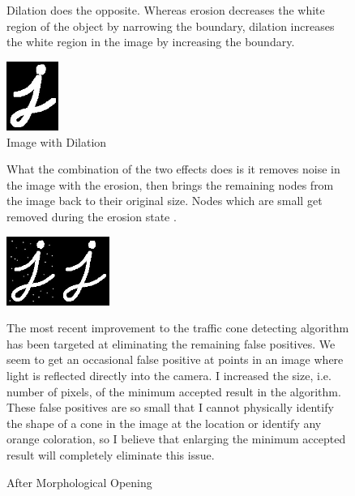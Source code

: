\documentclass[10pt,letterpaper,onecolumn,draftclsnofoot,journal]{IEEEtran}
\begin{document}
\begin{figure}[h]
	Dilation does the opposite. Whereas erosion decreases the white region of the object by narrowing the boundary, dilation increases the white region in the image by increasing the boundary.
	\vspace{.5cm}

	\begin{center}
	\captionsetup{justification=centering, margin=6.7cm, singlelinecheck=off}
    	\includegraphics[width=0.15\textwidth]{j2}
    	\caption{Image with Dilation}
	\end{center}
	\vspace{.5cm}
\end{figure}
\begin{figure}[h]
	What the combination of the two effects does is it removes noise in the image with the erosion, then brings the remaining nodes from the image 	back to their original size. Nodes which are small get removed during the erosion state \cite{opencv1}.\par
	\vspace{.5cm}
	\captionsetup{justification=raggedleft, margin=0cm, singlelinecheck=off}
	\hfill
    	\includegraphics[width=0.3\textwidth]{j3}
    	\caption{After Morphological Opening}
\vspace{.5cm}
\par
The most recent improvement to the traffic cone detecting algorithm has been targeted at eliminating the remaining false positives. We seem to get an occasional false positive at points in an image where light is reflected directly into the camera. I increased the size, i.e. number of pixels, of the minimum accepted result in the algorithm. These false positives are so small that I cannot physically identify the shape of a cone in the image at the location or identify any orange coloration, so I believe that enlarging the minimum accepted result will completely eliminate this issue.
\end{figure}
\end{document}
